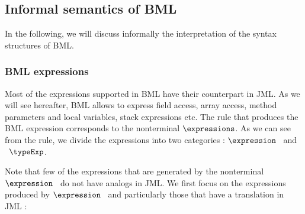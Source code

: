 \subsection{Informal semantics of BML}

In the following, we will discuss informally the interpretation of the syntax structures of BML.

\subsubsection{BML expressions}
Most of the expressions supported in BML have their counterpart in JML. As we will see hereafter, BML allows
to express field access, array access, method parameters and local variables, stack expressions etc.
The rule that produces the BML expression corresponds to the nonterminal   $\expressions$.
As we can see from the rule, we divide the expressions into two categories : $\expression$ \ and \ $\typeExp$.

Note that few of the expressions that are generated by the nonterminal $ \expression$ \  do not have analogs in JML.
 We first focus on the expressions produced by $\expression$ \  and particularly those that have a translation
in JML :


